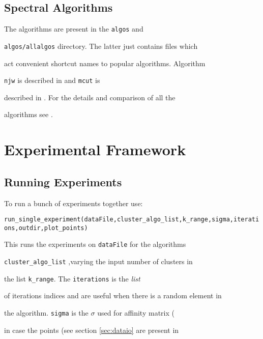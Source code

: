 \documentclass[10pt]{article}
\begin{document}
\subsection{Spectral Algorithms}

\label{sec:algos}





The algorithms are present in the \texttt{algos} and

\texttt{algos/allalgos} directory. The latter just contains files which

act convenient shortcut names to popular algorithms. Algorithm

\texttt{njw} is described in \cite{NgJW01} and \texttt{mcut} is

described in \cite{MeilaS00}. For the details and comparison of all the

algorithms see \cite{VM03}. 





\section{Experimental Framework}

\subsection{Running Experiments}

\label{sec:exp}



To run a bunch of experiments together use: 



\texttt{run\_single\_experiment(dataFile,cluster\_algo\_list,k\_range,sigma,iterations,outdir,plot\_points)}



This runs the experiments on \texttt{dataFile} for the algorithms

\texttt{cluster\_algo\_list} ,varying the input number of clusters in

the list \texttt{k\_range}. The \texttt{iterations} is the \emph{list}

of iterations indices and are useful when there is a random element in

the algorithm. \texttt{sigma} is the $\sigma$ used for affinity matrix (\cite{NgJW01}

in case the points (see section \ref{sec:dataio} are present in
\end{document}
